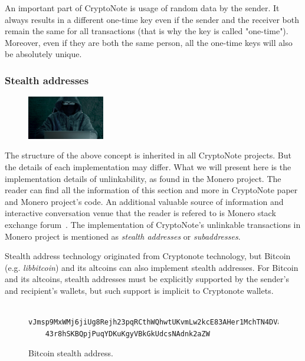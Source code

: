 An important part of CryptoNote is usage of random data by the sender. It always results in a different one-time key even if the sender and the receiver both remain the same for all transactions (that is why the key is called "one-time"). Moreover, even if they are both the same person, all the one-time keys will also be absolutely unique.

\subsubsection{Stealth addresses} \label{sec:stealth}
\begin{figure}
\centering
\includegraphics[width=0.30\textwidth]{Images/CryptoNote/stealth.jpg}
\end{figure}
The structure of the above concept is inherited in all CryptoNote projects. But the details of each implementation may differ. What we will present here is the implementation details of unlinkability, as found in the Monero project. The reader can find all the information of this section and more in CryptoNote paper~\cite{citeulike:14139412} and Monero project's code. An additional valuable source of information and interactive conversation venue that the reader is refered to is Monero stack exchange forum~\cite{stackexchange}. The implementation of CryptoNote's unlinkable transactions in Monero project is mentioned as \emph{stealth addresses} or \emph{subaddresses}.

Stealth address technology originated from Cryptonote technology, but Bitcoin (e.g. \emph{libbitcoin}) and its altcoins can also implement stealth addresses. For Bitcoin and its altcoins, stealth addresses must be explicitly supported by the sender's and recipient's wallets, but such support is implicit to Cryptonote wallets.

\begin{figure}
  \begin{verbatim}
    vJmsp9MxWMj6jiUg8Rejh23pqRCthWQhwtUKvmLw2kcE83AHer1MchTN4DVacHt
    43r8hSKBQpjPuqYDKuKgyVBkGkUdcsNAdnk2aZW
  \end{verbatim}
  \caption{Bitcoin stealth address.}
  \label{fig:btcstealth}
\end{figure}

